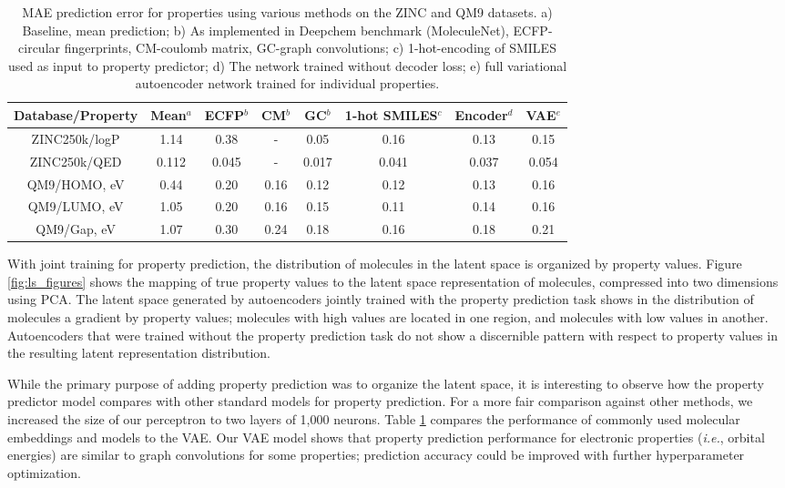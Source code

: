 \begin{table}[h]
\centering
\begin{tabular}{|c|c|c|c|c|c|c|c|}
\hline
Database/Property & Mean$^{a}$   & ECFP$^{b}$    & CM$^{b}$ & GC$^{b}$ &  1-hot SMILES$^{c}$ & Encoder$^{d}$ & VAE$^{e}$   \\ 
\hline
ZINC250k/logP & 1.14 & 0.38 & - & 0.05 & 0.16 & 0.13 & 0.15 \\ 
ZINC250k/QED & 0.112 & 0.045 & - & 0.017 & 0.041 & 0.037 & 0.054 \\ 
QM9/HOMO, eV & 0.44 & 0.20 & 0.16 & 0.12 & 0.12 & 0.13 & 0.16  \\ 
QM9/LUMO, eV & 1.05 & 0.20 & 0.16 & 0.15 & 0.11 & 0.14 & 0.16  \\
QM9/Gap, eV & 1.07 & 0.30 & 0.24 & 0.18 & 0.16 & 0.18 & 0.21  \\ 
\hline 
\end{tabular} 
\caption{\small	MAE prediction error for  properties using various methods on the ZINC and QM9 datasets. 
a) Baseline, mean prediction; b) As implemented in Deepchem benchmark (MoleculeNet)\cite{wu2017moleculenet}, ECFP-circular fingerprints, CM-coulomb matrix, GC-graph convolutions; c) 1-hot-encoding of SMILES used as input to property predictor; d) The network trained without decoder loss; e) full variational autoencoder network trained for individual properties.}
\label{tab:props_mae}
\end{table}

With joint training for property prediction, the distribution of molecules in the latent space is organized by property values. Figure \ref{fig:ls_figures} shows the mapping of true property values to the latent space representation of molecules, compressed into two dimensions using PCA. The latent space generated by autoencoders jointly trained with the property prediction task shows in the distribution of molecules a gradient by property values; molecules with high values are located in one region, and molecules with  low values in another. Autoencoders that were trained without the property prediction task do not show a discernible pattern with respect to property values in the resulting latent representation distribution. 

While the primary purpose of adding property prediction was to organize the latent space, it is interesting to observe how the property predictor model compares with other standard models for property prediction. For a more fair comparison against other methods, we increased the size of our perceptron to two layers of 1,000 neurons. Table \ref{tab:props_mae} compares the performance of commonly used molecular embeddings and models to the VAE. Our VAE model shows that property prediction performance for electronic properties (\textit{i.e.}, orbital energies) are similar to graph convolutions for some properties; prediction accuracy could be improved with further hyperparameter optimization.


